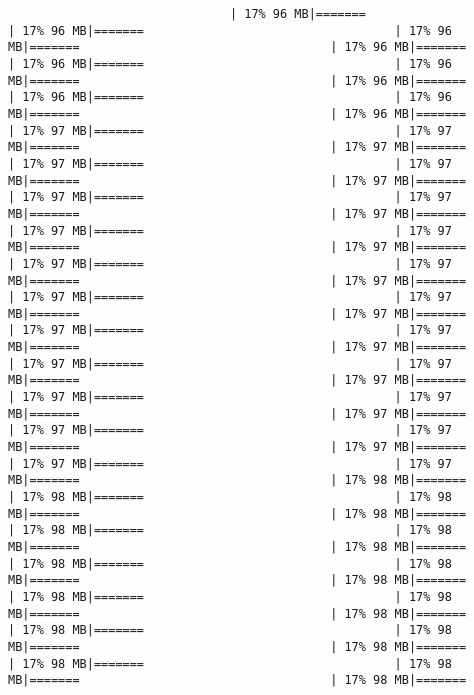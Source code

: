 \documentclass[
]{article}
\begin{document}
\begin{verbatim}
                               | 17% 96 MB|=======                                   | 17% 96 MB|=======                                   | 17% 96 MB|=======                                   | 17% 96 MB|=======                                   | 17% 96 MB|=======                                   | 17% 96 MB|=======                                   | 17% 96 MB|=======                                   | 17% 96 MB|=======                                   | 17% 96 MB|=======                                   | 17% 96 MB|=======                                   | 17% 97 MB|=======                                   | 17% 97 MB|=======                                   | 17% 97 MB|=======                                   | 17% 97 MB|=======                                   | 17% 97 MB|=======                                   | 17% 97 MB|=======                                   | 17% 97 MB|=======                                   | 17% 97 MB|=======                                   | 17% 97 MB|=======                                   | 17% 97 MB|=======                                   | 17% 97 MB|=======                                   | 17% 97 MB|=======                                   | 17% 97 MB|=======                                   | 17% 97 MB|=======                                   | 17% 97 MB|=======                                   | 17% 97 MB|=======                                   | 17% 97 MB|=======                                   | 17% 97 MB|=======                                   | 17% 97 MB|=======                                   | 17% 97 MB|=======                                   | 17% 97 MB|=======                                   | 17% 97 MB|=======                                   | 17% 97 MB|=======                                   | 17% 97 MB|=======                                   | 17% 97 MB|=======                                   | 17% 97 MB|=======                                   | 17% 97 MB|=======                                   | 17% 97 MB|=======                                   | 17% 97 MB|=======                                   | 17% 97 MB|=======                                   | 17% 97 MB|=======                                   | 17% 97 MB|=======                                   | 17% 98 MB|=======                                   | 17% 98 MB|=======                                   | 17% 98 MB|=======                                   | 17% 98 MB|=======                                   | 17% 98 MB|=======                                   | 17% 98 MB|=======                                   | 17% 98 MB|=======                                   | 17% 98 MB|=======                                   | 17% 98 MB|=======                                   | 17% 98 MB|=======                                   | 17% 98 MB|=======                                   | 17% 98 MB|=======                                   | 17% 98 MB|=======                                   | 17% 98 MB|=======                                   | 17% 98 MB|=======                                   | 17% 98 MB|=======                                   | 17% 98 MB|=======                                   | 17% 98 MB|=======                                   | 17% 98 MB|=======                             
\end{verbatim}
\end{document}

